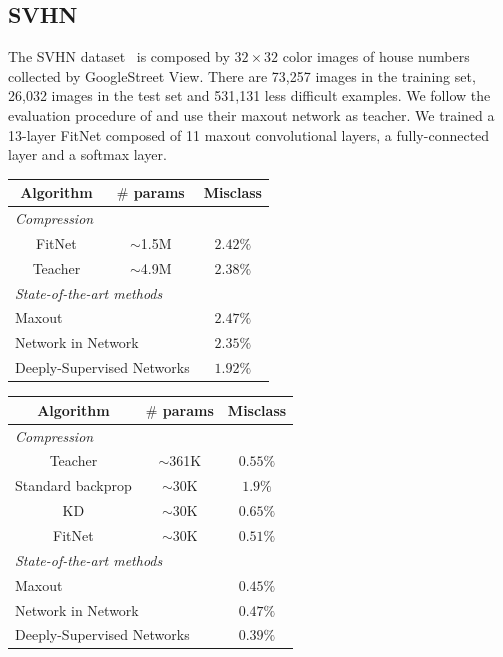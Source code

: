 \documentclass{article} %
\begin{document}
\vspace*{-1mm}
\subsection{SVHN}
\vspace*{-1mm}

The SVHN dataset~\citep{netzer.2011} is composed by $32 \times 32$ color images of house numbers collected by GoogleStreet View. There are 73,257 images in the training set, 26,032 images in the test set and 531,131 less difficult examples. We follow the evaluation procedure of \cite{Goodfellow13} and use their maxout network as teacher. We trained a 13-layer FitNet composed of 11 maxout convolutional layers, a fully-connected layer and a softmax layer.


\begin{minipage}[b]{.45\textwidth}
\small
\centering
\begin{tabular}{|c|c|c|}
\hline
\textbf{Algorithm} & \textbf{$\#$ params}  & \textbf{Misclass}\\ \hline
\hline
\multicolumn{3}{|l|}{\emph{Compression}} \\ \hline
FitNet & $\sim$1.5M &  $2.42\%$\\ \hline
Teacher & $\sim$4.9M & $\mathbf{2.38\%}$\\ \hline  \hline
\multicolumn{3}{|l|}{\emph{State-of-the-art methods}} \\ \hline
\multicolumn{2}{|l|}{Maxout}  & $2.47\%$\\ \hline
\multicolumn{2}{|l|}{Network in Network} &  $2.35\%$\\ \hline
\multicolumn{2}{|l|}{Deeply-Supervised Networks} &  $\mathbf{1.92\%}$\\ \hline
\end{tabular}
\label{tab:svhn}
\end{minipage}\qquad
\begin{minipage}[b]{.45\textwidth}
\small
\centering
\begin{tabular}{|c|c|c|}
\hline
\textbf{Algorithm} & \textbf{$\#$ params}  & \textbf{Misclass}\\ \hline
\hline
\multicolumn{3}{|l|}{\emph{Compression}} \\ \hline
Teacher & $\sim$361K & $0.55\%$ \\ \hline
Standard backprop & $\sim$30K & $1.9\%$ \\ \hline
KD & $\sim$30K & $0.65\%$ \\ \hline
FitNet & $\sim$30K & $\mathbf{0.51\%}$ \\ \hline
\multicolumn{3}{|l|}{\emph{State-of-the-art methods}} \\ \hline \hline
\multicolumn{2}{|l|}{Maxout} & $0.45\%$ \\ \hline
\multicolumn{2}{|l|}{Network in Network} & $0.47\%$ \\ \hline
\multicolumn{2}{|l|}{Deeply-Supervised Networks} & $\mathbf{0.39\%}$ \\ \hline
\end{tabular}
\label{tab:mnist}
\end{minipage}
\end{document}
